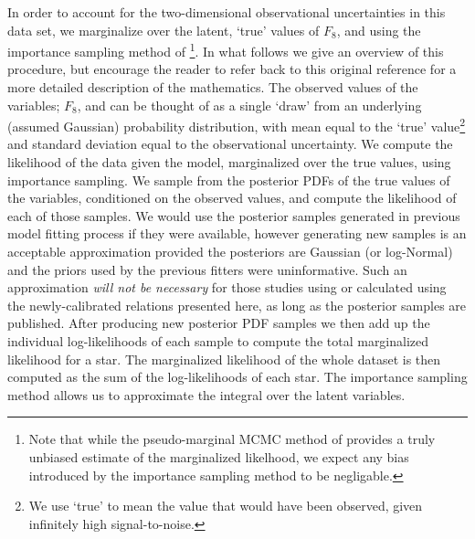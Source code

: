 In order to account for the two-dimensional observational uncertainties in
this data set, we marginalize over the latent, `true' values of $F_8$,
\rhostar and \logg using the importance sampling method of
\citep{hogg:2010}\footnote{Note that while the pseudo-marginal MCMC method of
\citep{andrieu:2009} provides a truly unbiased estimate of the marginalized
likelhood, we expect any bias introduced by the importance sampling method to
be negligable.}.
In what follows we give an overview of this procedure, but encourage the reader
to refer back  to this original reference for a more detailed description of
the mathematics.
The observed values of the variables; $F_8$, \rhostar and \logg can be thought
of as a single `draw' from an underlying (assumed Gaussian) probability
distribution, with mean equal to the `true' value\footnote{We use `true' to
mean the value that would have been observed, given infinitely high
signal-to-noise.} and standard deviation equal to the observational
uncertainty.
We compute the likelihood of the data given the model, marginalized over the
true values, using importance sampling.
We sample from the posterior PDFs of the true values of the variables,
conditioned on the observed values, and compute the likelihood of each of those
samples.
We would use the posterior samples generated in previous model fitting process
if they were available, however generating new samples is an acceptable
approximation provided the posteriors are Gaussian (or log-Normal) and the
priors used by the previous fitters were uninformative.
Such an approximation {\it will not be necessary} for those studies using
\rhostar or \logg calculated using the newly-calibrated relations
presented here, as long as the posterior samples are published.
After producing new posterior PDF samples we then add up the individual
log-likelihoods of each sample to compute the total marginalized likelihood
for a star.
The marginalized likelihood of the whole dataset is then computed as the sum
of the log-likelihoods of each star.
The importance sampling method allows us to approximate the integral over the
latent variables.

